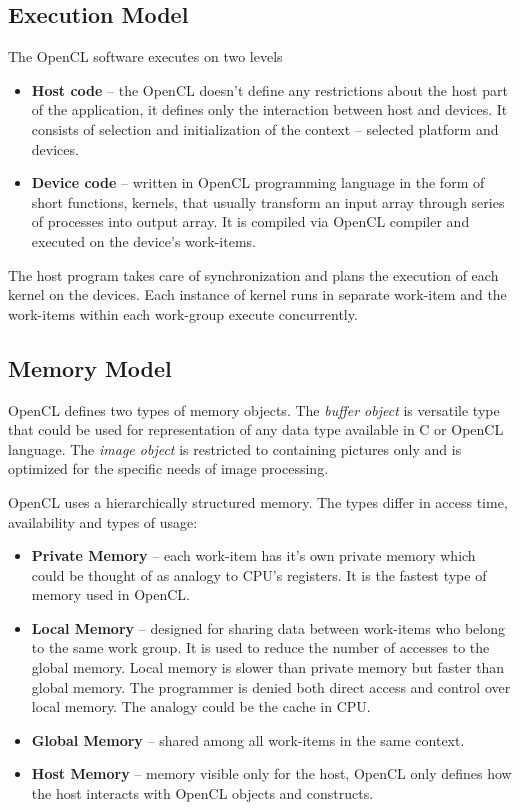 \subsection{Execution Model}
The OpenCL software executes on two levels
\begin{itemize}
\item \textbf{Host code} -- the OpenCL doesn't define any restrictions about the 
host part of the application, it defines only the interaction between host and 
devices. It consists of selection and initialization of the context -- selected 
platform and devices.
\item \textbf{Device code} -- written in OpenCL programming language in the form
of short functions, kernels, that usually transform an input array through 
series of processes into output array. It is compiled via OpenCL compiler and 
executed on the device's work-items.
\end{itemize}

The host program takes care of synchronization and plans the execution of each
kernel on the devices. Each instance of kernel runs in separate work-item and 
the work-items within each work-group execute concurrently. 

\subsection{Memory Model}
OpenCL defines two types of memory objects. The \textit{buffer object} is
versatile type that could be used for representation of any data type 
available in C or OpenCL language. The \textit{image object} is restricted 
to containing pictures only and is optimized for the specific needs of 
image processing.

OpenCL uses a hierarchically structured memory. The types differ in access time,
availability and types of usage\cite{opencl}:
\begin{itemize}
\item \textbf{Private Memory} -- each work-item has it's own private memory 
which could be thought of as analogy to CPU's registers. It is the fastest type 
of memory used in OpenCL.
\item \textbf{Local Memory} -- designed for sharing data between work-items who 
belong to the same work group. It is used to reduce the number of accesses to 
the global memory. Local memory is slower than private memory but faster than 
global memory. The programmer is denied both direct access and control over 
local memory. The analogy could be the cache in CPU.
\item \textbf{Global Memory} -- shared among all work-items in the same context.
\item \textbf{Host Memory} -- memory visible only for the host, OpenCL only 
defines how the host interacts with OpenCL objects and constructs.
\end{itemize}

